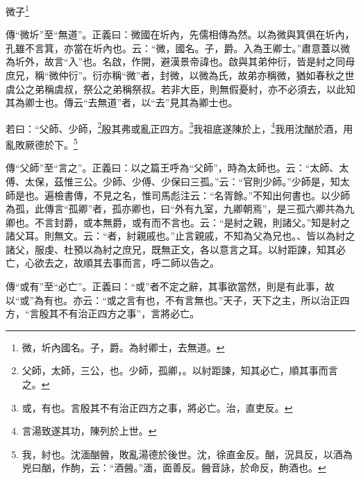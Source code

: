 微子\footnote{微，圻內國名。子，爵。為紂卿士，去無道。}

{\noindent\zhuan{}\fzbyks 傳“微圻”至“無道”。正義曰：微國在圻內，先儒相傳為然。以為微與箕俱在圻內，孔雖不言箕，亦當在圻內也。云：“微，國名。子，爵。入為王卿士。”肅意蓋以微為圻外，故言“入”也。名啟，作開，避漢景帝諱也。啟與其弟仲衍，皆是紂之同母庶兄，稱“微仲衍”。衍亦稱“微”者，封微，以微為氏，故弟亦稱微，猶如春秋之世虞公之弟稱虞叔，祭公之弟稱祭叔。若非大臣，則無假憂紂，亦不必須去，以此知其為卿士也。傳云“去無道”者，以“去”見其為卿士也。 \par}

若曰：“父師、少師，\footnote{父師，太師，三公，也。少師，孤卿，。以紂距諫，知其必亡，順其事而言之。}殷其弗或亂正四方。\footnote{或，有也。言殷其不有治正四方之事，將必亡。治，直吏反。}我祖底遂陳於上，\footnote{言湯致遂其功，陳列於上世。}我用沈酗於酒，用亂敗厥德於下。\footnote{我，紂也。沈湎酗醟，敗亂湯德於後世。沈，徐直金反。酗，況具反，以酒為兇曰酗，作䣱，云：“酒醟。”湎，面善反。醟音詠，於命反，䣱酒也。}


{\noindent\zhuan{}\fzbyks 傳“父師”至“言之”。正義曰：以之篇王呼為“父師”，時為太師也。云：“太師、太傅、太保，茲惟三公。少師、少傅、少保曰三孤。”云：“官則少師。”少師是，知太師是也。遍檢書傳，不見之名，惟司馬彪注云：“名胥餘。”不知出何書也。以少師為孤，此傳言“孤卿”者，孤亦卿也，曰“外有九室，九卿朝焉”，是三孤六卿共為九卿也。不言封爵，或本無爵，或有而不言也。云：“是紂之親，則諸父。”知是紂之諸父耳。則無文。云：“者，紂親戚也。”止言親戚，不知為父為兄也。、皆以為紂之諸父，服虔、杜預以為紂之庶兄，既無正文，各以意言之耳。以紂距諫，知其必亡，心欲去之，故順其去事而言，呼二師以告之。 \par}

{\noindent\zhuan{}\fzbyks 傳“或有”至“必亡”。正義曰：“或”者不定之辭，其事欲當然，則是有此事，故以“或”為有也。亦云：“或之言有也，不有言無也。”天子，天下之主，所以治正四方，“言殷其不有治正四方之事”，言將必亡。 \par}

